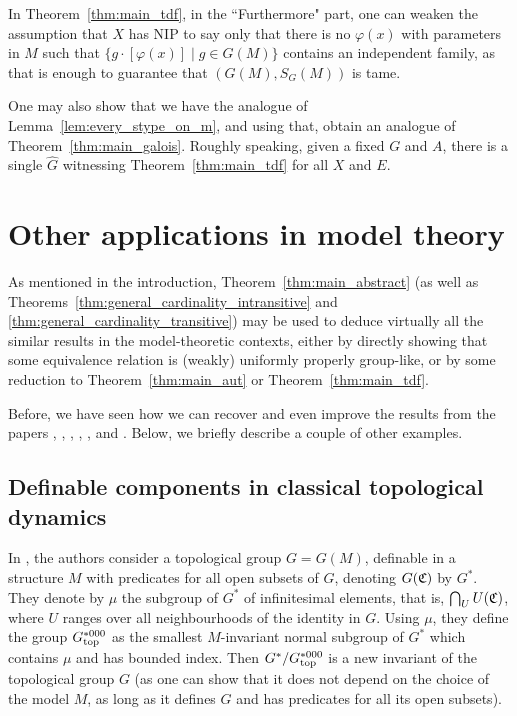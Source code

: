 	
	\begin{rem}
		In Theorem~\ref{thm:main_tdf}, in the ``Furthermore" part, one can weaken the assumption that $X$ has NIP to say only that there is no $\varphi(x)$ with parameters in $M$ such that $\{g\cdot [\varphi(x)]\mid g\in G(M) \}$ contains an independent family, as that is enough to guarantee that $(G(M),S_G(M))$ is tame.
		\xqed{\lozenge}
	\end{rem}
	
	\begin{rem}
		One may also show that we have the analogue of Lemma~\ref{lem:every_stype_on_m}, and using that, obtain an analogue of Theorem~\ref{thm:main_galois}. Roughly speaking, given a fixed $G$ and $A$, there is a single $\hat G$ witnessing Theorem~\ref{thm:main_tdf} for all $X$ and $E$.\xqed{\lozenge}
	\end{rem}
	
	\section{Other applications in model theory}
	\label{sec:other_apps}
	As mentioned in the introduction, Theorem~\ref{thm:main_abstract} (as well as Theorems~\ref{thm:general_cardinality_intransitive} and \ref{thm:general_cardinality_transitive}) may be used to deduce virtually all the similar results in the model-theoretic contexts, either by directly showing that some equivalence relation is (weakly) uniformly properly group-like, or by some reduction to Theorem~\ref{thm:main_aut} or Theorem~\ref{thm:main_tdf}.
	
	Before, we have seen how we can recover and even improve the results from the papers \cite{Ne03}, \cite{KMS14}, \cite{KM14}, \cite{KP17}, \cite{KR16}, \cite{KPR15} and \cite{KR18}. Below, we briefly describe a couple of other examples.
	
	\subsection*{Definable components in classical topological dynamics}
	
	In \cite{KP16}, the authors consider a topological group $G=G(M)$, definable in a structure $M$ with predicates for all open subsets of $G$, denoting $G({\mathfrak C})$ by $G^*$. They denote by $\mu$ the subgroup of $G^*$ of infinitesimal elements, that is, $\bigcap_U U({\mathfrak C})$, where $U$ ranges over all neighbourhoods of the identity in $G$. Using $\mu$, they define the group $G^{*000}_{{\mathrm{top}}}$ as the smallest $M$-invariant normal subgroup of $G^*$ which contains $\mu$ and has bounded index. Then $G^*/G^{*000}_{\mathrm{top}}$ is a new invariant of the topological group $G$ (as one can show that it does not depend on the choice of the model $M$, as long as it defines $G$ and has predicates for all its open subsets).
	
